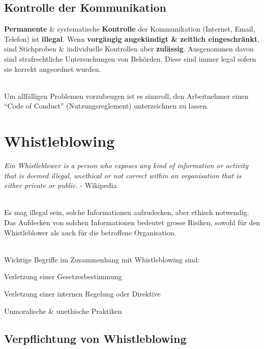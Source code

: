 \subsection{Kontrolle der Kommunikation}

\textbf{Permanente} \& systematische \textbf{Kontrolle} der
Kommunikation (Internet, Email, Telefon) ist \textbf{illegal}. Wenn
\textbf{vorgängig angekündigt \& zeitlich eingeschränkt}, sind
Stichproben \& individuelle Kontrollen aber \textbf{zulässig}. Ausgenommen
davon sind strafrechtliche Untersuchungen von Behörden. Diese sind immer legal
sofern sie korrekt angeordnet wurden.

\mbox{}\\
Um allfälligen Problemen vorzubeugen ist es sinnvoll, den Arbeitnehmer einen
``Code of Conduct'' (Nutzungsreglement) unterzeichnen zu lassen.

\clearpage
\section{Whistleblowing}

\emph{Ein Whistleblower is a person who exposes any kind of information or
activity that is deemed illegal, unethical or not correct within an
organisation that is either private or public.} - Wikipedia

\mbox{}\\
Es mag illegal sein, solche Informationen aufzudecken, aber ethisch notwendig.
Das Aufdecken von solchen Informationen bedeutet grosse Risiken, sowohl für den
Whistleblower als auch für die betroffene Organisation.

\mbox{}\\
Wichtige Begriffe im Zusammenhang mit Whistleblowing sind:
\begin{description}
	\tightlist
	\item[Illegal] Verletzung einer Gesetzesbestimmung
	\item[Illegitim] Verletzung einer internen Regelung oder Direktive
	\item[Unethisch] Unmoralische \& unethische Praktiken
\end{description}

\subsection{Verpflichtung von Whistleblowing}
\label{sec:IW-Verpflichtungen}

